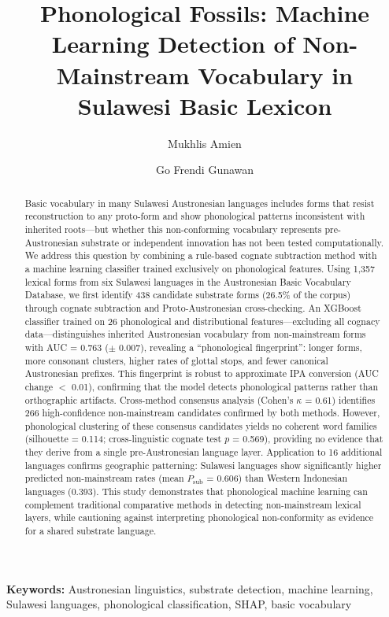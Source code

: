 \documentclass[12pt]{article}
\title{Phonological Fossils: Machine Learning Detection of Non-Mainstream Vocabulary in Sulawesi Basic Lexicon}
\author{Mukhlis Amien \and Go Frendi Gunawan}
\date{}
\begin{document}
\maketitle

\begin{abstract}
Basic vocabulary in many Sulawesi Austronesian languages includes forms that resist reconstruction to any proto-form and show phonological patterns inconsistent with inherited roots---but whether this non-conforming vocabulary represents pre-Austronesian substrate or independent innovation has not been tested computationally.
We address this question by combining a rule-based cognate subtraction method with a machine learning classifier trained exclusively on phonological features.
Using 1,357 lexical forms from six Sulawesi languages in the Austronesian Basic Vocabulary Database, we first identify 438 candidate substrate forms (26.5\% of the corpus) through cognate subtraction and Proto-Austronesian cross-checking.
An XGBoost classifier trained on 26 phonological and distributional features---excluding all cognacy data---distinguishes inherited Austronesian vocabulary from non-mainstream forms with AUC = 0.763 ($\pm$ 0.007), revealing a ``phonological fingerprint'': longer forms, more consonant clusters, higher rates of glottal stops, and fewer canonical Austronesian prefixes.
This fingerprint is robust to approximate IPA conversion (AUC change $<$ 0.01), confirming that the model detects phonological patterns rather than orthographic artifacts.
Cross-method consensus analysis (Cohen's $\kappa$ = 0.61) identifies 266 high-confidence non-mainstream candidates confirmed by both methods.
However, phonological clustering of these consensus candidates yields no coherent word families (silhouette = 0.114; cross-linguistic cognate test $p$ = 0.569), providing no evidence that they derive from a single pre-Austronesian language layer.
Application to 16 additional languages confirms geographic patterning: Sulawesi languages show significantly higher predicted non-mainstream rates (mean $P_\mathrm{sub}$ = 0.606) than Western Indonesian languages (0.393).
This study demonstrates that phonological machine learning can complement traditional comparative methods in detecting non-mainstream lexical layers, while cautioning against interpreting phonological non-conformity as evidence for a shared substrate language.
\end{abstract}

\noindent\textbf{Keywords:} Austronesian linguistics, substrate detection, machine learning, Sulawesi languages, phonological classification, SHAP, basic vocabulary
\end{document}
